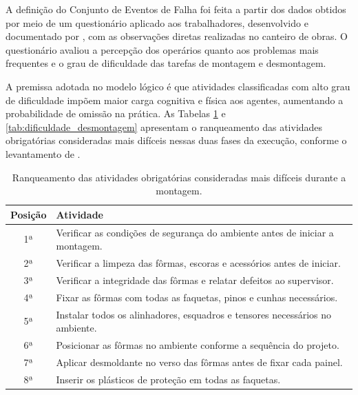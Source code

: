 A definição do Conjunto de Eventos de Falha foi feita a partir dos dados obtidos por meio de um questionário aplicado aos trabalhadores, desenvolvido e documentado por , com as observações diretas realizadas no canteiro de obras. O questionário avaliou a percepção dos operários quanto aos problemas mais frequentes e o grau de dificuldade das tarefas de montagem e desmontagem. 

A premissa adotada no modelo lógico é que atividades classificadas com alto grau de dificuldade impõem maior carga cognitiva e física aos agentes, aumentando a probabilidade de omissão na prática. As Tabelas \ref{tab:dificuldade_montagem} e \ref{tab:dificuldade_desmontagem} apresentam o ranqueamento das atividades obrigatórias consideradas mais difíceis nessas duas fases da execução, conforme o levantamento de .

\begin{table}[!htb]
	\centering
	\caption{Ranqueamento das atividades obrigatórias consideradas mais difíceis durante a montagem.}
	\label{tab:dificuldade_montagem}
	\begin{tabular}{cl}
		\hline
		\textbf{Posição} & \textbf{Atividade} \\
		\hline
		1ª & Verificar as condições de segurança do ambiente antes de iniciar a montagem. \\
		2ª & Verificar a limpeza das fôrmas, escoras e acessórios antes de iniciar. \\
		3ª & Verificar a integridade das fôrmas e relatar defeitos ao supervisor. \\
		4ª & Fixar as fôrmas com todas as faquetas, pinos e cunhas necessários. \\
		5ª & Instalar todos os alinhadores, esquadros e tensores necessários no ambiente. \\
		6ª & Posicionar as fôrmas no ambiente conforme a sequência do projeto. \\
		7ª & Aplicar desmoldante no verso das fôrmas antes de fixar cada painel. \\
		8ª & Inserir os plásticos de proteção em todas as faquetas. \\
		\hline
	\end{tabular}
\end{table}

